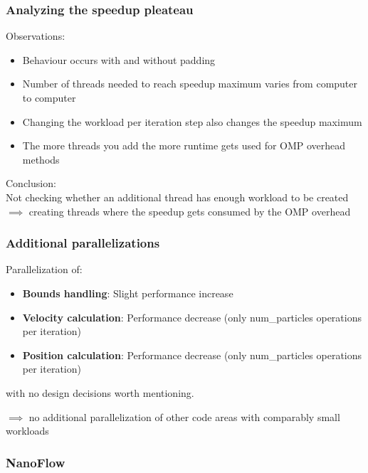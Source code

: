 \begin{frame}
	\frametitle{Analyzing the speedup pleateau}
	\large
	Observations:
	\vspace{-0.3cm}
	\begin{itemize}
		\item<1-> Behaviour occurs with and without padding
		\item<2-> Number of threads needed to reach speedup maximum varies from computer to computer
		\item<3-> Changing the workload per iteration step also changes the speedup maximum
		\item<4-> The more threads you add the more runtime gets used for OMP overhead methods
	\end{itemize}
	\pause
	\pause
	\pause
	\pause

	Conclusion: \\
	Not checking whether an additional thread has enough workload to be created $\implies$ creating threads where the speedup gets consumed by the OMP overhead
	
\end{frame}

\begin{frame}
	\frametitle{Additional parallelizations}
	\large
	Parallelization of:
	\begin{itemize}
		\item \textbf{Bounds handling}: Slight performance increase
		\item \textbf{Velocity calculation}: Performance decrease (only num\_particles operations per iteration)
		\item \textbf{Position calculation}: Performance decrease (only num\_particles operations per iteration)
	\end{itemize}
	with no design decisions worth mentioning.
	
	\vspace{0.5cm}
	
	$\implies$ no additional parallelization of other code areas with comparably small workloads
\end{frame}

\begin{frame}
	\frametitle{NanoFlow}
	
\end{frame}


